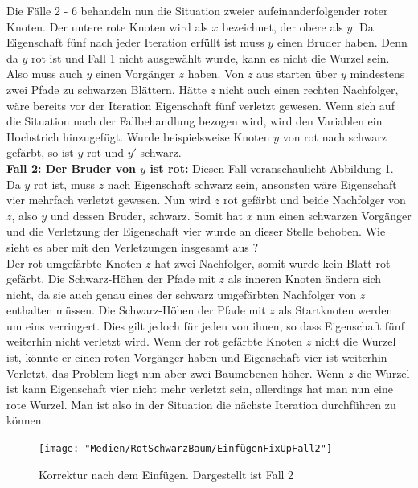 \documentclass[a4paper,12pt]{article}
\begin{document}
\noindent Die Fälle 2 - 6 behandeln nun die Situation zweier aufeinanderfolgender roter Knoten.  Der untere rote Knoten wird als $x$ bezeichnet, der obere als $y$. Da Eigenschaft fünf nach jeder Iteration erfüllt ist muss $y$ einen Bruder haben. Denn da $y$ rot ist und Fall 1 nicht ausgewählt wurde, kann es nicht die Wurzel sein. Also muss auch $y$ einen Vorgänger $z$ haben. Von $z$ aus starten über $y$ mindestens zwei Pfade zu schwarzen Blättern. Hätte $z$ nicht auch einen rechten Nachfolger, wäre bereits vor der Iteration Eigenschaft fünf verletzt gewesen. Wenn sich auf die Situation nach der Fallbehandlung bezogen wird, wird den Variablen ein Hochstrich hinzugefügt. Wurde beispielsweise Knoten $y$ von rot nach schwarz gefärbt, so ist $y$ rot und $y'$ schwarz. \\
\noindent\textbf{Fall 2: Der Bruder von $y$ ist rot: }
\noindent Diesen Fall veranschaulicht Abbildung \ref{fig:EinfügenFixUpFall2}. Da $y$ rot ist, muss $z$ nach Eigenschaft schwarz sein, ansonsten wäre Eigenschaft vier mehrfach verletzt gewesen. Nun wird $z$ rot gefärbt und beide Nachfolger von $z$, also $y$ und dessen Bruder, schwarz. Somit hat $x$ nun einen schwarzen Vorgänger und die Verletzung der Eigenschaft vier wurde an dieser Stelle behoben. Wie sieht es aber mit den Verletzungen insgesamt aus ? \\
Der rot umgefärbte Knoten $z$ hat zwei Nachfolger, somit wurde kein Blatt rot gefärbt. Die Schwarz-Höhen der Pfade mit $z$ als inneren Knoten ändern sich nicht, da sie auch genau eines der schwarz umgefärbten Nachfolger von $z$ enthalten müssen. Die Schwarz-Höhen der Pfade mit $z$ als Startknoten werden um eins verringert. Dies gilt jedoch für jeden von ihnen, so dass Eigenschaft fünf weiterhin nicht verletzt wird. Wenn der rot gefärbte Knoten $z$ nicht die Wurzel ist, könnte er einen roten Vorgänger haben und Eigenschaft vier ist weiterhin Verletzt, das Problem liegt nun aber zwei Baumebenen höher. Wenn $z$ die Wurzel ist kann Eigenschaft vier nicht mehr verletzt sein, allerdings hat man nun eine rote Wurzel. Man ist also in der Situation die nächste Iteration durchführen zu können.\\
\begin{figure}[h]
	\centering
	\texttt{[image: "Medien/RotSchwarzBaum/EinfügenFixUpFall2"]}
	\caption{Korrektur nach dem Einfügen. Dargestellt ist Fall 2  }
	\label{fig:EinfügenFixUpFall2}
\end{figure}
\end{document}
